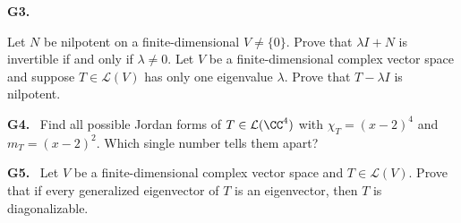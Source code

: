 \documentclass[10pt]{scrartcl}
\newcommand{\LL}{\mathcal L}\newcommand{\PP}{\mathcal P}\newcommand{\MM}{\mathcal M}
\begin{document}
\begin{prob}
\textbf{G3. }\ 
\begin{enumerate}[(a)]
  \ii Let $N$ be nilpotent on a finite-dimensional $V\ne\{0\}$. Prove that $\lambda I+N$ is invertible if and only if $\lambda\ne0$.
  \ii Let $V$ be a finite-dimensional complex vector space and suppose $T\in\LL(V)$ has only one eigenvalue $\lambda$. Prove that $T-\lambda I$ is nilpotent.
\end{enumerate}
\end{prob}

\begin{prob}
\textbf{G4. }\ Find all possible Jordan forms of $T\in\LL(\CC^4)$ with $\chi_T=(x-2)^4$ and $m_T=(x-2)^2$. Which single number tells them apart?
\end{prob}

\begin{prob}
\textbf{G5. }\ Let $V$ be a finite-dimensional complex vector space and $T\in\LL(V)$. Prove that if every generalized eigenvector of $T$ is an eigenvector, then $T$ is diagonalizable.
\end{prob}
\end{document}
